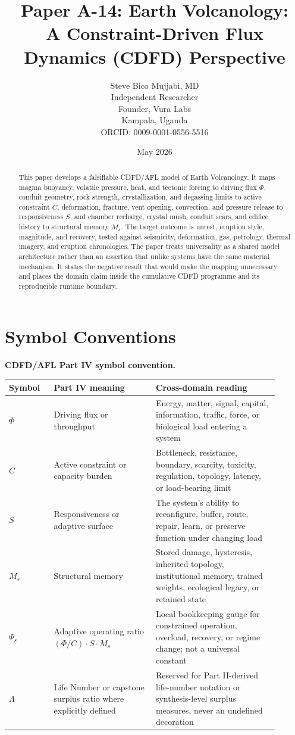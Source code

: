 \documentclass[11pt,a4paper]{article}
\title{\textbf{Paper A-14: Earth Volcanology:\\ A Constraint-Driven Flux Dynamics (CDFD) Perspective}}
\author{Steve Bico Mujjabi, MD\\
\small Independent Researcher\\
\small Founder, Vura Labs\\
\small Kampala, Uganda\\
\small ORCID: 0009-0001-0556-5516}
\date{May 2026}
\begin{document}
\maketitle


\begin{abstract}
This paper develops a falsifiable CDFD/AFL model of Earth Volcanology. It maps magma buoyancy, volatile pressure, heat, and tectonic forcing to driving flux $\Phi$, conduit geometry, rock strength, crystallization, and degassing limits to active constraint $C$, deformation, fracture, vent opening, convection, and pressure release to responsiveness $S$, and chamber recharge, crystal mush, conduit scars, and edifice history to structural memory $M_s$. The target outcome is unrest, eruption style, magnitude, and recovery, tested against seismicity, deformation, gas, petrology, thermal imagery, and eruption chronologies. The paper treats universality as a shared model architecture rather than an assertion that unlike systems have the same material mechanism. It states the negative result that would make the mapping unnecessary and places the domain claim inside the cumulative CDFD programme and its reproducible runtime boundary.
\end{abstract}

\section*{Symbol Conventions}

\noindent\textbf{CDFD/AFL Part IV symbol convention.}
\begin{center}
{\small
\begin{tabular}{p{0.15\linewidth}p{0.34\linewidth}p{0.41\linewidth}}
\hline
Symbol & Part IV meaning & Cross-domain reading \\
\hline
$\Phi$ & Driving flux or throughput & Energy, matter, signal, capital, information, traffic, force, or biological load entering a system \\
$C$ & Active constraint or capacity burden & Bottleneck, resistance, boundary, scarcity, toxicity, regulation, topology, latency, or load-bearing limit \\
$S$ & Responsiveness or adaptive surface & The system's ability to reconfigure, buffer, route, repair, learn, or preserve function under changing load \\
$M_s$ & Structural memory & Stored damage, hysteresis, inherited topology, institutional memory, trained weights, ecological legacy, or retained state \\
$\Psi_s$ & Adaptive operating ratio $(\Phi/C)\cdot S\cdot M_s$ & Local bookkeeping gauge for constrained operation, overload, recovery, or regime change; not a universal constant \\
$\Lambda$ & Life Number or capstone surplus ratio where explicitly defined & Reserved for Part II-derived life-number notation or synthesis-level surplus measures, never an undefined decoration \\
\hline
\end{tabular}
}
\end{center}
\end{document}
